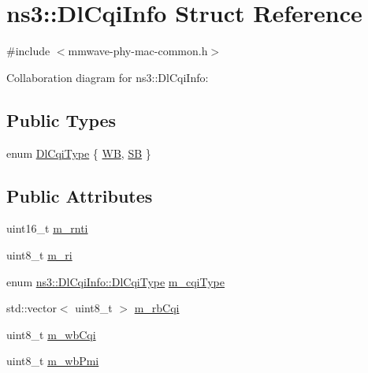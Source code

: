 \hypertarget{structns3_1_1DlCqiInfo}{}\section{ns3\+:\+:Dl\+Cqi\+Info Struct Reference}
\label{structns3_1_1DlCqiInfo}


{\ttfamily \#include $<$mmwave-\/phy-\/mac-\/common.\+h$>$}



Collaboration diagram for ns3\+:\+:Dl\+Cqi\+Info\+:
\subsection*{Public Types}
\begin{DoxyCompactItemize}
\item 
enum \hyperlink{structns3_1_1DlCqiInfo_a58a9fff4b49e4a8df1fdea1005c4735c}{Dl\+Cqi\+Type} \{ \hyperlink{structns3_1_1DlCqiInfo_a58a9fff4b49e4a8df1fdea1005c4735caa1097f844b06ac6dbdbac42802ba2403}{WB}, 
\hyperlink{structns3_1_1DlCqiInfo_a58a9fff4b49e4a8df1fdea1005c4735ca034739d53a545902d795f3b2b6c8564c}{SB}
 \}
\end{DoxyCompactItemize}
\subsection*{Public Attributes}
\begin{DoxyCompactItemize}
\item 
uint16\+\_\+t \hyperlink{structns3_1_1DlCqiInfo_ac255e44a52e27fa8b181f8b4fa627358}{m\+\_\+rnti}
\item 
uint8\+\_\+t \hyperlink{structns3_1_1DlCqiInfo_aa772ec4b65a8ef85b674eb9d7940436b}{m\+\_\+ri}
\item 
enum \hyperlink{structns3_1_1DlCqiInfo_a58a9fff4b49e4a8df1fdea1005c4735c}{ns3\+::\+Dl\+Cqi\+Info\+::\+Dl\+Cqi\+Type} \hyperlink{structns3_1_1DlCqiInfo_acd41b20c81bf99ae02444c1f0d1a06ca}{m\+\_\+cqi\+Type}
\item 
std\+::vector$<$ uint8\+\_\+t $>$ \hyperlink{structns3_1_1DlCqiInfo_a326df5503df15cf8a108430902eaf022}{m\+\_\+rb\+Cqi}
\item 
uint8\+\_\+t \hyperlink{structns3_1_1DlCqiInfo_a6a834558ac211bd60a79b88ce2b9d205}{m\+\_\+wb\+Cqi}
\item 
uint8\+\_\+t \hyperlink{structns3_1_1DlCqiInfo_a9e50e887fb7b608f1fe07da411e2340c}{m\+\_\+wb\+Pmi}
\end{DoxyCompactItemize}


